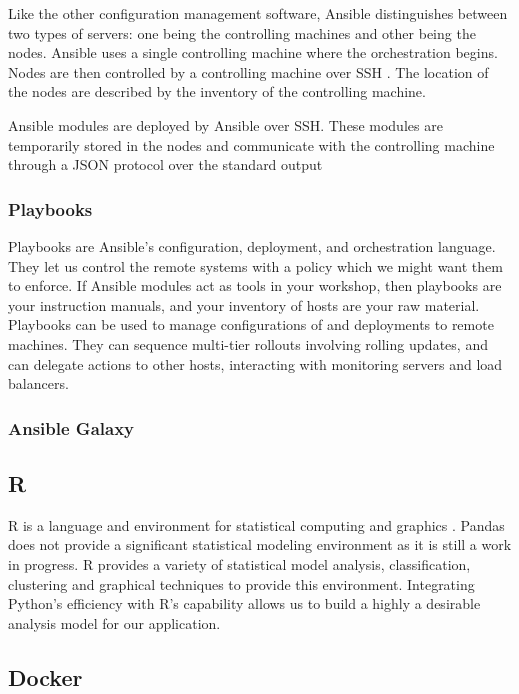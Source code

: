 \documentclass[9pt,twocolumn,twoside]{../../styles/osajnl}
\begin{document}
Like the other configuration management software, Ansible
distinguishes between two types of servers: one being the controlling
machines and other being the nodes. Ansible uses a single controlling
machine where the orchestration begins. Nodes are then controlled by a
controlling machine over SSH \cite{www-ssh}. The location of the nodes
are described by the inventory of the controlling machine.

Ansible modules are deployed by Ansible over SSH. These modules are
temporarily stored in the nodes and communicate with the controlling
machine through a JSON protocol over the standard output

\subsubsection{Playbooks}

Playbooks \cite{www-ansible-playbook} are Ansible’s configuration,
deployment, and orchestration language. They let us control the remote
systems with a policy which we might want them to enforce. If Ansible
modules act as tools in your workshop, then playbooks are your
instruction manuals, and your inventory of hosts are your raw
material. Playbooks can be used to manage configurations of and
deployments to remote machines. They can sequence multi-tier rollouts
involving rolling updates, and can delegate actions to other hosts,
interacting with monitoring servers and load balancers.

\subsubsection{Ansible Galaxy}

\subsection{R}
R is a language and environment for statistical computing and graphics
\cite{www-about-rproject}. Pandas does not provide a significant
statistical modeling environment as it is still a work in progress. R
provides a variety of statistical model analysis, classification,
clustering and graphical techniques to provide this
environment. Integrating Python's efficiency with R's capability
allows us to build a highly a desirable analysis model for our
application.


\subsection{Docker}
\end{document}
